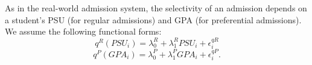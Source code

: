 As in the real-world admission system, the selectivity of an admission depends on a student's PSU (for regular admissions) and GPA (for preferential admissions). We assume the following functional forms:
\begin{equation}\label{eq:selR}
    q^R(PSU_i)=\lambda^R_0 +\lambda^R_1 PSU_i + \epsilon_i^{qR}
\end{equation}
\begin{equation}\label{eq:selP}
    q^P(GPA_i)=\lambda^P_0 +\lambda^P_1 GPA_i + \epsilon_i^{qP}.
\end{equation}
  


